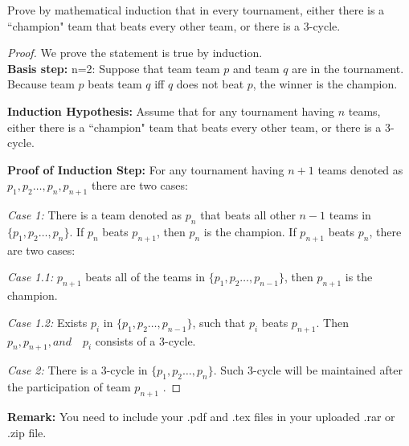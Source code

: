 \documentclass[12pt,a4paper]{article}
\theoremstyle{definition}
\begin{document}
\begin{enumerate}
Prove by mathematical induction that in every tournament, either there is a ``champion" team that beats every other team, or there is a 3-cycle. 
    \begin{proof} We prove the statement is true by induction.
   	~\\
   	\textbf{Basis step:} n=2: Suppose that team team $p$ and team $q$ are in the tournament. Because team $p$ beats team $q$ iff $q$
does not beat $p$, the winner is the champion.  

	\textbf{Induction Hypothesis:} Assume that for any tournament having $n$ teams, either there is a ``champion" team that beats every other team, or there is a 3-cycle.  
	
	\textbf{Proof of Induction Step:} For any tournament having $n+1$ teams denoted as $p_1,p_2\dots , p_{n},p_{n+1}$ there are two cases:
	
	\textit{Case 1:} There is a team denoted as $p_n$ that beats all other $n-1$ teams in $\{p_1,p_2 \dots , p_{n}\}$. If $p_n$ beats $p_{n+1}$, then $p_n$ is the champion. If $p_{n+1}$ beats $p_{n}$, there are two cases:  
	
	\textit{Case 1.1:} $p_{n+1}$ beats all of the teams in $\{p_1,p_2\dots , p_{n-1}\}$, then $p_{n+1}$ is the champion.
	
	\textit{Case 1.2:} Exists $p_i$ in $\{p_1,p_2 \dots , p_{n-1}\}$, such that $p_i$ beats $p_{n+1}$. Then $p_n, p_{n+1},and \quad p_i$ consists of a 3-cycle.
	
	\textit{Case 2:} There is a 3-cycle in $\{p_1,p_2 \dots , p_{n}\}$. Such 3-cycle will be maintained after the participation of team $p_{n+1}$ .
    \end{proof}

\end{enumerate}

\vspace{20pt}

\textbf{Remark:} You need to include your .pdf and .tex files in your uploaded .rar or .zip file.

\end{document}
